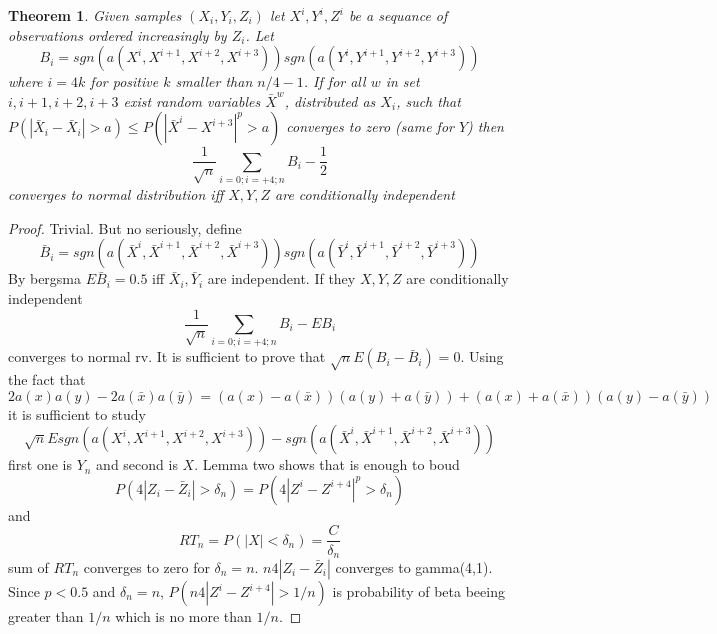 \documentclass{article}
\newtheorem{Theorem}{Theorem}
\begin{document}
\begin{Theorem}
 Given samples $(X_i,Y_i,Z_i)$ let $X^{i},Y^{i},Z^{i}$ be a sequance of observations ordered increasingly  by $Z_i$. Let
 \[ 
B_i = sgn(a(X^{i},X^{i+1},X^{i+2},X^{i+3})) sgn(a(Y^{i},Y^{i+1},Y^{i+2},Y^{i+3}))  
 \]
where  $i=4k$ for positive $k$ smaller than $n/4-1$. If for all $w$ in set $i,i+1,i+2,i+3$ exist random variables $\bar X^{w}$, distributed as $X_i$, such that  $P(|\bar X_i - \bar X_i| > a) \leq  P(|\bar X^{i} - X^{i+3}|^p > a) $ converges to zero (same for $Y$) then 
\[
 \frac{1}{\sqrt n} \sum_{i=0;i=+4;n} B_i -\frac{1}{2}  
\]
converges to normal distribution iff $X,Y,Z$ are conditionally independent
\end{Theorem}
\begin{proof}
Trivial.  But no seriously, define
\[
 \bar B_i = sgn(a(\bar X^{i},\bar X^{i+1},\bar X^{i+2}, \bar X^{i+3})) sgn(a(\bar Y^{i},\bar Y^{i+1},\bar Y^{i+2},\bar Y^{i+3}))
\]
By bergsma $E \bar B_i = 0.5$ iff $\bar X_i , \bar Y_i$ are independent. If they $X,Y,Z$ are conditionally independent
\[
 \frac{1}{\sqrt n} \sum_{i=0;i=+4;n} B_i -E B_i 
\]
converges to normal rv. It is sufficient to prove that $\sqrt n E (B_i - \bar B_i) =0$.  Using the fact that 
\[
 2a(x)a(y) - 2a(\bar x) a(\bar y) = (a(x) - a(\bar x))(a(y) + a(\bar y)) + (a(x) + a(\bar x))(a(y) - a(\bar y))
\]
it is sufficient to study 
\[
 \sqrt n E sgn(a(X^{i},X^{i+1},X^{i+2},X^{i+3})) - sgn(a(\bar X^{i},\bar X^{i+1},\bar X^{i+2}, \bar X^{i+3}))
\]
first one is $Y_n$ and second is $X$. Lemma two shows that is enough to boud 
\[
 P( 4|Z_i-\bar Z_i| > \delta_n) = P( 4|Z^i - Z^{i+4}|^p > \delta_n  ) 
\]
and 
\[
 RT_n = P( |X| < \delta_n ) = \frac{C} {\delta_n}
\]
sum of $RT_n$ converges to zero for $\delta_n=n$. 
$n 4|Z_i-\bar Z_i|$ converges to gamma(4,1). Since $p<0.5$ and $\delta_n=n$, $P( n4|Z^i - Z^{i+4}| > 1/n ) $ 
is probability of beta beeing greater than $  1/n$ which is no more than $1/n$.
\end{proof}











\end{document}
